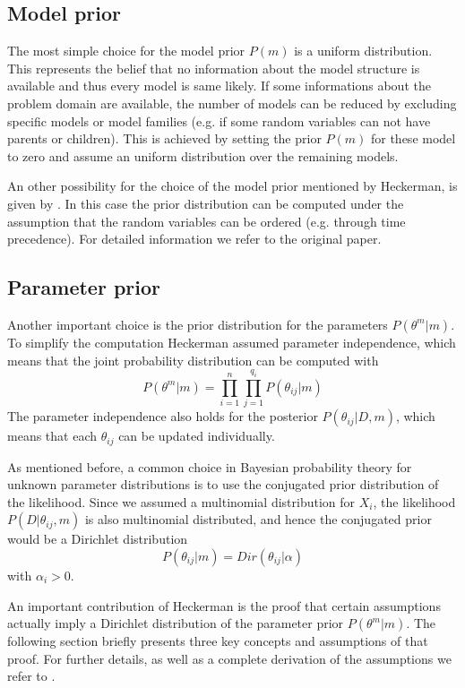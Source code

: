 \documentclass{article}
\begin{document}
	\subsection{Model prior}
	\label{sec:model_prior}
	The most simple choice for the model prior $P(m)$ is a uniform distribution. This represents 
	the belief that no information about the model structure is	available and thus every 
	model is same likely. If some informations about the problem domain are available, the number 
	of models can be reduced by excluding specific models or model families (e.g. if some random
	variables can not have parents or children). This is achieved by setting
	the prior $P(m)$ for these model to zero and assume an uniform distribution over the remaining
	models.	
	
	An other possibility for the choice of the model prior mentioned by Heckerman, is given
	by \cite{buntine}. In this case the prior distribution can be computed under the assumption that
	the random variables can be ordered (e.g. through time precedence). For detailed information we
	refer to the original paper.
	
	\subsection{Parameter prior}
	\label{sec:parameter_prior}
	Another important choice is the prior distribution for the parameters $P(\theta^m|m)$. To simplify
	the computation Heckerman assumed parameter independence, which means that the joint probability
	distribution can be computed with
	\[
		P(\theta^m|m)= \prod_{i=1}^n \prod_{j=1}^{q_i} P(\theta_{ij}|m)
	\]
	The parameter independence also holds for the posterior $P(\theta_{ij}|D,m)$, which means
	that each $\theta_{ij}$ can be updated individually.
	
	As mentioned before, a common choice in Bayesian probability theory for unknown parameter distributions
	is to use the conjugated prior distribution of the likelihood.
	Since we assumed a multinomial distribution
	for $X_i$, the likelihood $P(D|\theta_{ij},m)$ is also multinomial distributed, and hence the
	conjugated prior would be a Dirichlet distribution
	\[
		P(\theta_{ij}|m) = Dir(\theta_{ij}|\alpha)
	\]
	with $\alpha_i > 0$.
	
	An important contribution of Heckerman is the proof that certain assumptions actually 
	imply a Dirichlet distribution of the parameter prior $P(\theta^m|m)$.
	The following section briefly presents three key concepts and assumptions of that proof.
	For further details, as well as a complete derivation of the assumptions we refer to \cite{hcg}.
	
\end{document}
